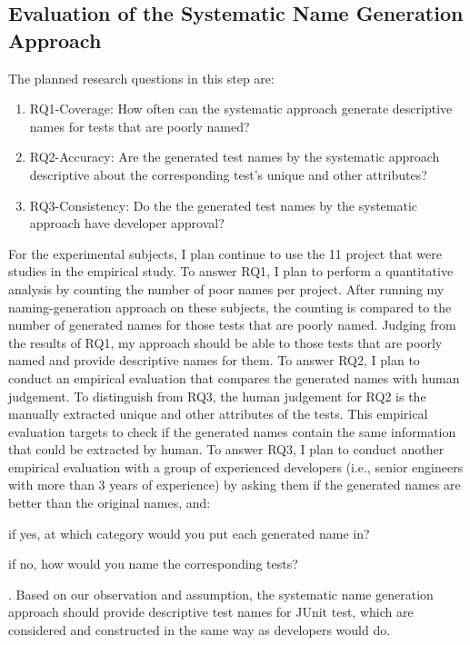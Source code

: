 \subsection{Evaluation of the Systematic Name Generation Approach}

The planned research questions in this step are:
%
\begin{enumerate}
    \item RQ1-Coverage: How often can the systematic approach generate descriptive names for tests that are poorly named?
    \item RQ2-Accuracy: Are the generated test names by the systematic approach descriptive about the corresponding test's unique and other attributes?
    \item RQ3-Consistency: Do the the generated test names by the systematic approach have developer approval?
\end{enumerate}

For the experimental subjects, I plan continue to use the \num{11} project that were studies in the empirical study.
%
To answer RQ1, I plan to perform a quantitative analysis by counting the number of poor names per project.
%
After running my naming-generation approach on these subjects, the counting is compared to the number of generated names for those tests that are poorly named.
%
Judging from the results of RQ1, my approach should be able to those tests that are poorly named and provide descriptive names for them.
%
To answer RQ2, I plan to conduct an empirical evaluation that compares the generated names with human judgement.
%
To distinguish from RQ3, the human judgement for RQ2 is the manually extracted unique and other attributes of the tests.
%
This empirical evaluation targets to check if the generated names contain the same information that could be extracted by human.
%
To answer RQ3, I plan to conduct another empirical evaluation with a group of experienced developers (i.e., senior engineers with more than \num{3} years of experience) by asking them if the generated names are better than the original names, and:
\begin{enumerate*}
    \item if yes, at which category would you put each generated name in?
    \item if no, how would you name the corresponding tests?
\end{enumerate*}.
%
Based on our observation and assumption, the systematic name generation approach should provide descriptive test names for JUnit test, which are considered and constructed in the same way as developers would do. 


